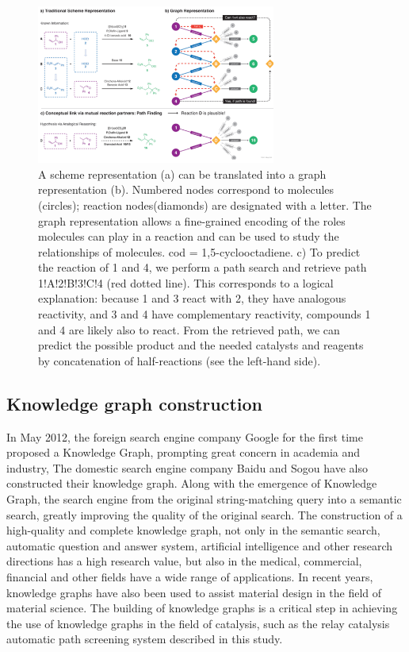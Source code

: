 \documentclass[%
 aip,
 jmp,%
 amsmath,amssymb,
 reprint,%
]{revtex4-2}
\begin{document}
\begin{figure}[htbp]
 \centering
 \includegraphics[width=0.7\textwidth]{figure/6.png}
 \caption{ A scheme representation (a) can be translated into a graph representation (b). Numbered nodes correspond to molecules (circles); reaction nodes(diamonds) are designated with a letter. The graph representation allows a fine-grained encoding of the roles molecules can play in a reaction and can be used to study the relationships of molecules. cod = 1,5-cyclooctadiene. c) To predict the reaction of 1 and 4, we perform a path search and retrieve path 1!A!2!B!3!C!4 (red dotted line). This corresponds to a logical explanation: because 1 and 3 react with 2, they have analogous reactivity, and 3 and 4 have complementary reactivity, compounds 1 and 4 are likely also to react. From the retrieved path, we can predict the possible product and the needed catalysts and reagents by concatenation of half-reactions (see the left-hand side). }
 \label{ Fig.6 }
\end{figure}

\subsection{Knowledge graph construction}

In May 2012, the foreign search engine company Google for the first time proposed a Knowledge Graph\cite{fensel2020introduction}, prompting great concern in academia and industry, The domestic search engine company Baidu and Sogou have also constructed their knowledge graph\cite{yu2017knowledge, SogouKG}. Along with the emergence of Knowledge Graph, the search engine from the original string-matching query into a semantic search\cite{zhu2017intelligent}, greatly improving the quality of the original search. The construction of a high-quality and complete knowledge graph, not only in the semantic search, automatic question and answer system\cite{he2021optimizing, abujabal2017automated, saha2018complex}, artificial intelligence and other research directions has a high research value, but also in the medical, commercial, financial and other fields have a wide range of applications\cite{li2020real, elhammadi2020high}. In recent years, knowledge graphs have also been used to assist material design in the field of material science. The building of knowledge graphs is a critical step in achieving the use of knowledge graphs in the field of catalysis, such as the relay catalysis automatic path screening system described in this study.
\end{document}
